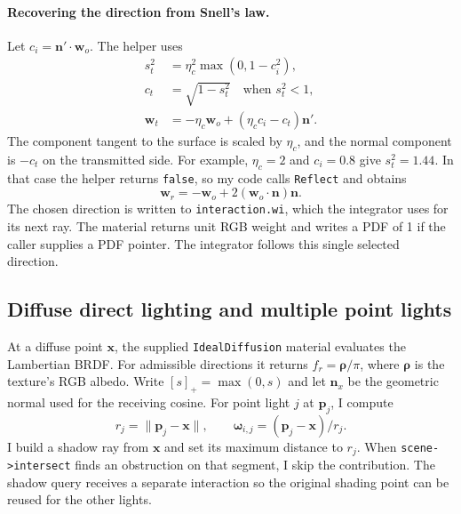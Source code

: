\documentclass[acmtog]{acmart}
\begin{document}
\paragraph{Recovering the direction from Snell's law.}
Let $c_i=\mathbf n'\cdot\mathbf w_o$. The helper uses
\begin{align}
s_t^2 &= \eta_c^2 \max(0,1-c_i^2),\\
c_t &= \sqrt{1-s_t^2}\quad\text{when }s_t^2<1,\\
\mathbf w_t &=
 -\eta_c\mathbf w_o+(\eta_c c_i-c_t)\mathbf n' .
\end{align}
The component tangent to the surface is scaled by $\eta_c$, and the normal component is $-c_t$ on the transmitted side. For example, $\eta_c=2$ and $c_i=0.8$ give $s_t^2=1.44$. In that case the helper returns \texttt{false}, so my code calls \texttt{Reflect} and obtains
\begin{equation}
\mathbf w_r=-\mathbf w_o+2(\mathbf w_o\cdot\mathbf n)\mathbf n.
\end{equation}
The chosen direction is written to \texttt{interaction.wi}, which the integrator uses for its next ray. The material returns unit RGB weight and writes a PDF of 1 if the caller supplies a PDF pointer. The integrator follows this single selected direction.

\subsection{Diffuse direct lighting and multiple point lights}
At a diffuse point $\mathbf x$, the supplied \texttt{IdealDiffusion} material evaluates the Lambertian BRDF. For admissible directions it returns $f_r=\boldsymbol\rho/\pi$, where $\boldsymbol\rho$ is the texture's RGB albedo. Write $[s]_+=\max(0,s)$ and let $\mathbf n_x$ be the geometric normal used for the receiving cosine. For point light $j$ at $\mathbf p_j$, I compute
\begin{equation}
r_j=\|\mathbf p_j-\mathbf x\|,\qquad
\boldsymbol\omega_{i,j}=(\mathbf p_j-\mathbf x)/r_j .
\end{equation}
I build a shadow ray from $\mathbf x$ and set its maximum distance to $r_j$. When \texttt{scene->intersect} finds an obstruction on that segment, I skip the contribution. The shadow query receives a separate interaction so the original shading point can be reused for the other lights.
\end{document}
